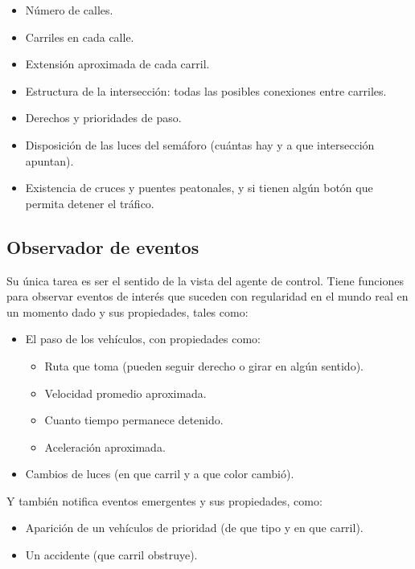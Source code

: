\begin{itemize}
\tightlist
\item
  Número de calles.
\item
  Carriles en cada calle.
\item
  Extensión aproximada de cada carril.
\item
  Estructura de la intersección: todas las posibles conexiones entre
  carriles.
\item
  Derechos y prioridades de paso.
\item
  Disposición de las luces del semáforo (cuántas hay y a que
  intersección apuntan).
\item
  Existencia de cruces y puentes peatonales, y si tienen algún botón que
  permita detener el tráfico.
\end{itemize}

\hypertarget{observador-de-eventos}{%
\subsection{Observador de eventos}\label{observador-de-eventos}}

Su única tarea es ser el sentido de la vista del agente de control.
Tiene funciones para observar eventos de interés que suceden con
regularidad en el mundo real en un momento dado y sus propiedades, tales
como:

\begin{itemize}
\tightlist
\item
  El paso de los vehículos, con propiedades como:

  \begin{itemize}
  \tightlist
  \item
    Ruta que toma (pueden seguir derecho o girar en algún sentido).
  \item
    Velocidad promedio aproximada.
  \item
    Cuanto tiempo permanece detenido.
  \item
    Aceleración aproximada.
  \end{itemize}
\item
  Cambios de luces (en que carril y a que color cambió).
\end{itemize}

Y también notifica eventos emergentes y sus propiedades, como:

\begin{itemize}
\tightlist
\item
  Aparición de un vehículos de prioridad (de que tipo y en que carril).
\item
  Un accidente (que carril obstruye).
\end{itemize}

